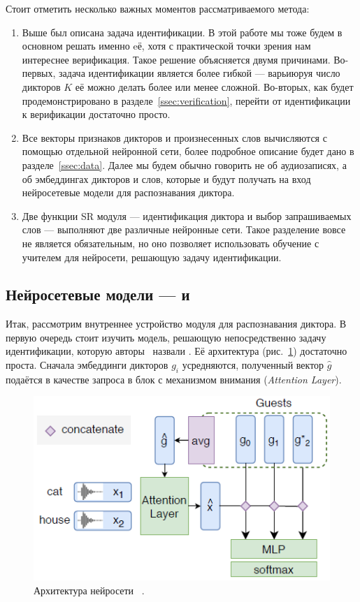 Стоит отметить несколько важных моментов рассматриваемого метода:
\begin{enumerate}
    \item Выше был описана задача идентификации. В этой работе мы тоже будем в
    основном решать именно eё, хотя с практической точки зрения нам интереснее
    верификация. Такое решение объясняется двумя причинами.  Во-первых, задача
    идентификации является более гибкой --- варьиюруя число дикторов $K$ её
    можно делать более или менее сложной. Во-вторых, как будет
    продемонстрировано в разделе~\ref{ssec:verification}, перейти от
    идентификации к верификации достаточно просто.
    \item Все векторы признаков дикторов и произнесенных слов вычисляются с
    помощью отдельной нейронной сети, более подробное описание будет дано в
    разделе~\ref{ssec:data}. Далее мы будем обычно говорить не об аудиозаписях,
    а об эмбеддингах дикторов и слов, которые и будут получать на вход
    нейросетевые модели для распознавания диктора.
    \item Две функции SR модуля --- идентификация диктора и выбор запрашиваемых
    слов --- выполняют две различные нейронные сети. Такое разделение вовсе не
    является обязательным, но оно позволяет использовать обучение с учителем для
    нейросети, решающую задачу идентификации.
\end{enumerate}

\subsection{Нейросетевые модели --- \guesser{} и \enquirer{}}\label{ssec:nnet}

Итак, рассмотрим внутреннее устройство модуля для распознавания диктора. В
первую очередь стоит изучить модель, решающую непосредственно задачу
идентификации, которую авторы~\citeisr{} назвали \guesser{}. Её архитектура
(рис.~\ref{fig:guesser}) достаточно проста. Сначала эмбеддинги дикторов $g_i$
усредняются, полученный вектор $\hat{g}$ подаётся в качестве запроса в блок
с механизмом внимания (\textit{Attention Layer}).

\begin{figure}[hbt]
    \centering
    \includegraphics[scale=1.0]{figures/guesser.png}
    \caption{Архитектура нейросети \guesser{}~\citeisr.}
    \label{fig:guesser}
\end{figure}

